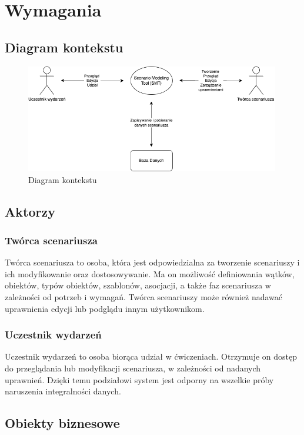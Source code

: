 \chapter{Wymagania}

\section{Diagram kontekstu}
\begin{figure}[h!]
    \centering
    \includegraphics[width=0.99\textwidth]{resources/local/diagram-kontekstu.png}
    \caption{Diagram kontekstu}
\end{figure}

\section{Aktorzy}

\subsection{Twórca scenariusza}
Twórca scenariusza to osoba, która jest odpowiedzialna za tworzenie scenariuszy i ich modyfikowanie oraz dostosowywanie. Ma on możliwość
definiowania wątków, obiektów, typów obiektów, szablonów, asocjacji, a także faz scenariusza w zależności od potrzeb i wymagań. Twórca scenariuszy może również
nadawać uprawnienia edycji lub podglądu innym użytkownikom.

\subsection{Uczestnik wydarzeń}
Uczestnik wydarzeń to osoba biorąca udział w ćwiczeniach. Otrzymuje on dostęp do przeglądania lub modyfikacji scenariusza, w zależności od nadanych uprawnień.
Dzięki temu podziałowi system jest odporny na wszelkie próby naruszenia integralności danych.

\section{Obiekty biznesowe}


